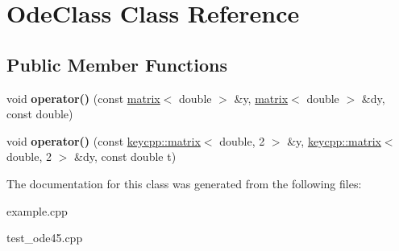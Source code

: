 \hypertarget{class_ode_class}{\section{Ode\-Class Class Reference}
\label{class_ode_class}
}
\subsection*{Public Member Functions}
\begin{DoxyCompactItemize}
\item 
\hypertarget{class_ode_class_a1c4fbb90c42265ba4e81664a192f1d8f}{void {\bfseries operator()} (const \hyperlink{classkeycpp_1_1matrix}{matrix}$<$ double $>$ \&y, \hyperlink{classkeycpp_1_1matrix}{matrix}$<$ double $>$ \&dy, const double)}\label{class_ode_class_a1c4fbb90c42265ba4e81664a192f1d8f}

\item 
\hypertarget{class_ode_class_a269b7862197785ff7c52d453cfa0b98e}{void {\bfseries operator()} (const \hyperlink{classkeycpp_1_1matrix}{keycpp\-::matrix}$<$ double, 2 $>$ \&y, \hyperlink{classkeycpp_1_1matrix}{keycpp\-::matrix}$<$ double, 2 $>$ \&dy, const double t)}\label{class_ode_class_a269b7862197785ff7c52d453cfa0b98e}

\end{DoxyCompactItemize}


The documentation for this class was generated from the following files\-:\begin{DoxyCompactItemize}
\item 
example.\-cpp\item 
test\-\_\-ode45.\-cpp\end{DoxyCompactItemize}
